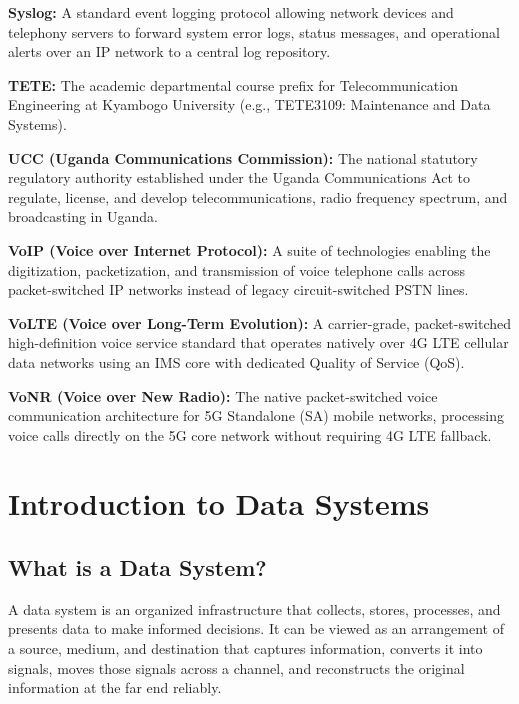\documentclass[12pt,a4paper]{report}
\begin{document}
\vspace{0.2cm}
\noindent\textbf{Syslog:} A standard event logging protocol allowing network devices and telephony servers to forward system error logs, status messages, and operational alerts over an IP network to a central log repository.

\vspace{0.2cm}
\noindent\textbf{TETE:} The academic departmental course prefix for Telecommunication Engineering at Kyambogo University (e.g., TETE3109: Maintenance and Data Systems).

\vspace{0.2cm}
\noindent\textbf{UCC (Uganda Communications Commission):} The national statutory regulatory authority established under the Uganda Communications Act to regulate, license, and develop telecommunications, radio frequency spectrum, and broadcasting in Uganda.

\vspace{0.2cm}
\noindent\textbf{VoIP (Voice over Internet Protocol):} A suite of technologies enabling the digitization, packetization, and transmission of voice telephone calls across packet-switched IP networks instead of legacy circuit-switched PSTN lines.

\vspace{0.2cm}
\noindent\textbf{VoLTE (Voice over Long-Term Evolution):} A carrier-grade, packet-switched high-definition voice service standard that operates natively over 4G LTE cellular data networks using an IMS core with dedicated Quality of Service (QoS).

\vspace{0.2cm}
\noindent\textbf{VoNR (Voice over New Radio):} The native packet-switched voice communication architecture for 5G Standalone (SA) mobile networks, processing voice calls directly on the 5G core network without requiring 4G LTE fallback.

\clearpage
\onehalfspacing

\chapter{Introduction to Data Systems}

\section{What is a Data System?}
A data system is an organized infrastructure that collects, stores, processes, and presents data to make informed decisions. It can be viewed as an arrangement of a source, medium, and destination that captures information, converts it into signals, moves those signals across a channel, and reconstructs the original information at the far end reliably.
\end{document}
